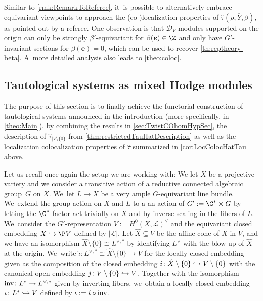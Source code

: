 \documentclass[JEP,XML,SOM,Unicode,published]{cedram}
\newcommand\hto{\mathrel{\lhook\joinrel\to}}
\newcommand{\bme}{{\boldsymbol{e}}}
\begin{document}
\begin{rmk}\label{rmk:RemarkRefColoc}
Similar to \cref{rmk:RemarkToReferee}, it~is possible to alternatively embrace equivariant viewpoints to approach the (co-)localization properties of $\hat\tau(\rho, \overline Y, \beta)$, as pointed out by a referee. One observation is that $\mathscr D_V$\nobreakdash-mod\-ules supported on the origin can only be strongly $\beta'$-equivariant for $\beta(\bme) \in \Z$ and only have $G'$-invariant sections for $\beta(\bme) = 0$, which can be used to recover \cref{th:reptheory-beta}. A~more detailed analysis also leads to \cref{theo:coloc}.
\end{rmk}

\subsection{Tautological systems as mixed Hodge modules}
\label{subsec:TautMHM}

The purpose of this section is to finally achieve the functorial construction of tautological systems
announced in the introduction (more specifically, in \cref{theo:Main}), by combining the results in
\cref{sec:TwistCOhomHypSec}, the description of $\hat\tau_{|V\setminus \{0\}}$ from \cref{thm:restrictedTauHatDescription} as well as the localization \resp colocalization properties of $\hat\tau$ summarized in \cref{cor:LocColocHatTau} above.

Let us recall once again the setup we are working with: We let $X$ be a projective variety and we consider a transitive action of a reductive connected algebraic group~$G$ on $X$. We~let $L \to X$ be a very ample $G$-equivariant line bundle. We~extend the group action on $X$ and $L$ to a an action of $G' := \C^* \times G$ by letting the $\C^*$-factor act trivially on $X$ and by inverse scaling in the fibers of $L$. We~consider the $G'$-representation $V:=H^0(X,\mathscr{L})^\vee$ and the equivariant closed embedding $X\hto \P V$ defined by $|\mathscr{L}|$.
Let $\hat{X}\subseteq V$ be the affine cone of $X$ in $V$, and we have an isomorphism $\hat{X} \setminus \{0\} \cong L^{\vee,*}$ by identifying $L^{\vee}$ with the blow-up of $\hat X$ at the origin. We~write $\hat\iota \colon L^{\vee,*} \cong \hat X \setminus \{0\} \to V$ for the locally closed embedding given as the composition of
the closed embedding $i \colon \hat{X}\setminus \{0\} \hto V\setminus \{0\}$ with the canonical open embedding
$j \colon V\setminus \{0\} \hto V$.
Together with the isomorphism $\textup{inv} \colon L^* \to L^{\vee,*}$ given by inverting fibers, we~obtain a locally closed embedding $\iota \colon L^* \hto V$ defined by $\iota:=\hat\iota\circ \textup{inv}$.
\end{document}
